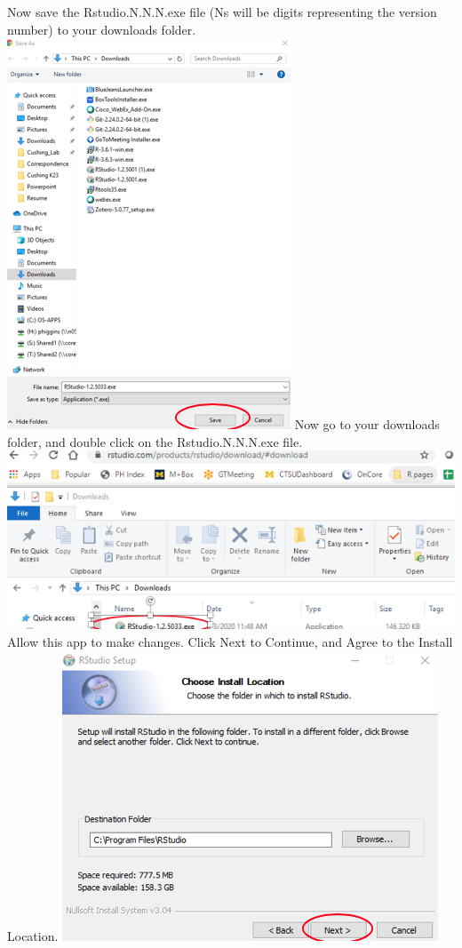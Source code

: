 \documentclass[
]{book}
\begin{document}
Now save the Rstudio.N.N.N.exe file (Ns will be digits representing the version number) to your downloads folder.
\includegraphics{images/rstudio_winsave.png}
Now go to your downloads folder, and double click on the Rstudio.N.N.N.exe file.
\includegraphics{images/rstudio_winlaunch.png}
Allow this app to make changes. Click Next to Continue, and Agree to the Install Location.
\includegraphics{images/rstudio_wininstall.png}
\end{document}
